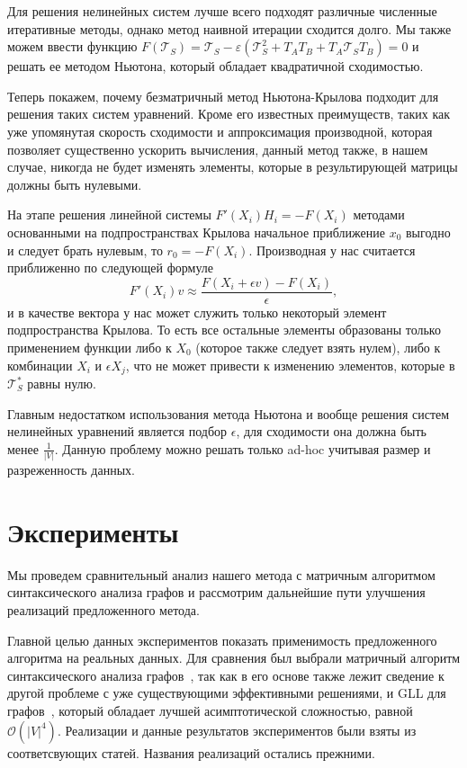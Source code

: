 \documentclass[12pt]{matmex-diploma-custom}
\begin{document}
Для решения нелинейных систем лучше всего подходят различные численные итеративные методы, однако метод наивной итерации сходится долго. Мы также можем ввести функцию $F(\mathcal{T}_S) = \mathcal{T}_S - \varepsilon (\mathcal{T}^2_S +  T_AT_B + T_A\mathcal{T}_S T_B) = 0$ и решать ее методом Ньютона, который обладает квадратичной сходимостью.

Теперь покажем, почему безматричный метод Ньютона-Крылова подходит для решения таких систем уравнений. 
Кроме его известных преимуществ, таких как уже упомянутая скорость сходимости и аппроксимация производной, которая позволяет существенно ускорить вычисления, данный метод также, в нашем случае, никогда не будет изменять элементы, которые в результирующей матрицы должны быть нулевыми.

На этапе решения линейной системы $F'(X_i) H_i = -F(X_i)$ методами основанными на подпространствах Крылова начальное приближение $x_0$ выгодно  и следует брать нулевым, то $r_0 = -F(X_i)$. Производная у нас считается приближенно по следующей формуле 
$$F'(X_i)v \approx \frac{F(X_i + \epsilon v) - F(X_i)}{\epsilon},$$
и в качестве вектора у нас может служить только некоторый элемент подпространства Крылова.
То есть все остальные элементы образованы только применением функции либо к $X_0$ (которое также следует взять нулем), либо к комбинации $X_i$ и $\epsilon X_j$, что не может привести к изменению элементов, которые в $\mathcal{T}^*_S$ равны нулю.

Главным недостатком использования метода Ньютона и вообще решения систем нелинейных уравнений является подбор $\epsilon$, для сходимости она должна быть менее $\frac{1}{|V|}$. Данную проблему можно решать только ad-hoc учитывая размер и разреженность данных.

\section{Эксперименты}

Мы проведем сравнительный анализ нашего метода с матричным алгоритмом синтаксического анализа графов и рассмотрим дальнейшие пути улучшения реализаций предложенного метода.

Главной целью данных экспериментов показать применимость предложенного алгоритма на реальных данных. 
Для сравнения был выбрали матричный алгоритм синтаксического анализа графов~\cite{azimov2018context}, так как в его основе также лежит сведение к другой проблеме с уже существующими эффективными решениями, и GLL для графов~\cite{grigorev2017context}, который обладает лучшей асимптотической сложностью, равной $\mathcal{O}(|V|^4)$. Реализации и данные результатов экспериментов были взяты из соответсвующих статей. Названия реализаций остались прежними.
\end{document}
